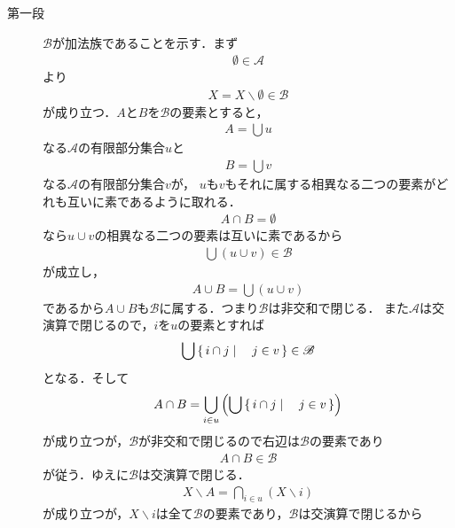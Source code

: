 		\begin{prf}\mbox{}
			\begin{description}
				\item[第一段]
					$\mathscr{B}$が加法族であることを示す．まず
					\begin{align}
						\emptyset \in \mathscr{A}
					\end{align}
					より
					\begin{align}
						X = X \backslash \emptyset \in \mathscr{B}
					\end{align}
					が成り立つ．$A$と$B$を$\mathscr{B}$の要素とすると，
					\begin{align}
						A = \bigcup u
					\end{align}
					なる$\mathscr{A}$の有限部分集合$u$と
					\begin{align}
						B = \bigcup v
					\end{align}
					なる$\mathscr{A}$の有限部分集合$v$が，
					$u$も$v$もそれに属する相異なる二つの要素がどれも互いに素であるように取れる．
					\begin{align}
						A \cap B = \emptyset
					\end{align}
					なら$u \cup v$の相異なる二つの要素は互いに素であるから
					\begin{align}
						\bigcup (u \cup v) \in \mathscr{B}
					\end{align}
					が成立し，
					\begin{align}
						A \cup B = \bigcup (u \cup v)
					\end{align}
					であるから$A \cup B$も$\mathscr{B}$に属する．つまり$\mathscr{B}$は非交和で閉じる．
					また$\mathscr{A}$は交演算で閉じるので，$i$を$u$の要素とすれば
					\begin{align}
						\bigcup \left\{\, i \cap j \mid \quad j \in v\, \right\} \in \mathscr{B}
					\end{align}
					となる．そして
					\begin{align}
						A \cap B = \bigcup_{i \in u} \left( \bigcup \left\{\, i \cap j \mid \quad j \in v\, \right\} \right)
					\end{align}
					が成り立つが，$\mathscr{B}$が非交和で閉じるので右辺は$\mathscr{B}$の要素であり
					\begin{align}
						A \cap B \in \mathscr{B}
					\end{align}
					が従う．ゆえに$\mathscr{B}$は交演算で閉じる．
					\begin{align}
						X \backslash A = \bigcap_{i \in u} (X \backslash i)
					\end{align}
					が成り立つが，$X \backslash i$は全て$\mathscr{B}$の要素であり，$\mathscr{B}$は交演算で閉じるから

\end{description}
\end{prf}
